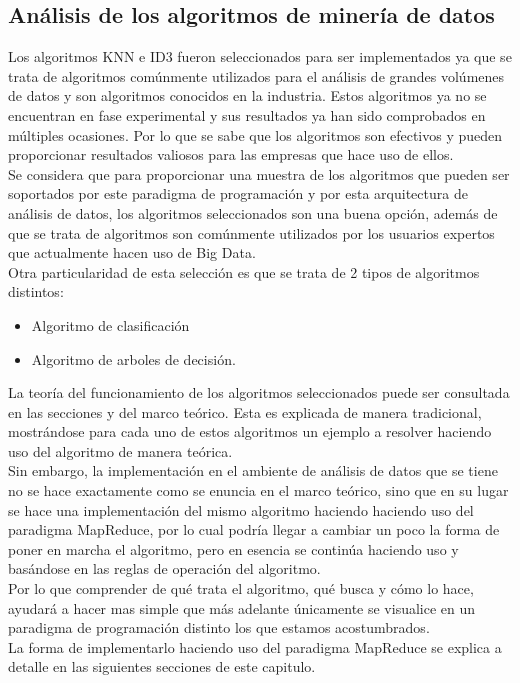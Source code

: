 \subsection{Análisis de los algoritmos de minería de datos}
Los algoritmos KNN e ID3 fueron seleccionados para ser implementados ya que se trata de algoritmos comúnmente utilizados para el análisis de grandes volúmenes de datos y son algoritmos conocidos en la industria. Estos algoritmos ya no se encuentran en fase experimental y sus resultados ya han sido comprobados en múltiples ocasiones. Por lo que se sabe que los algoritmos son efectivos y pueden proporcionar resultados valiosos para las empresas que hace uso de ellos.
\\
Se considera que para proporcionar una muestra de los algoritmos que pueden ser soportados por este paradigma de programación y por esta arquitectura de análisis de datos, los algoritmos seleccionados son una buena opción, además de que se trata de algoritmos son comúnmente utilizados por los usuarios expertos que actualmente hacen uso de Big Data.
\\
Otra particularidad de esta selección es que se trata de 2 tipos de algoritmos distintos: 
\begin{itemize}
	\item Algoritmo de clasificación
	\item Algoritmo de arboles de decisión.
\end{itemize} 

La teoría del funcionamiento de los algoritmos seleccionados puede ser consultada en las secciones  y  del marco teórico. Esta es explicada de
manera tradicional, mostrándose para cada uno de estos algoritmos un ejemplo a resolver haciendo uso del algoritmo de manera teórica.
\\
Sin embargo, la implementación en el ambiente de análisis de datos que se tiene no se hace exactamente como se enuncia en el marco teórico, sino que en su lugar se hace una implementación del mismo algoritmo haciendo haciendo uso del paradigma MapReduce, por lo cual podría llegar a cambiar un poco la forma de poner en marcha el algoritmo, pero en esencia se continúa haciendo uso y basándose en las reglas de operación del algoritmo. \\
Por lo que comprender de qué trata el algoritmo, qué busca y cómo lo hace, ayudará a hacer mas simple que más adelante únicamente se visualice en un paradigma de programación distinto los que estamos acostumbrados.\\
La forma de implementarlo haciendo uso del paradigma MapReduce se explica a detalle en las siguientes secciones de este capitulo.
